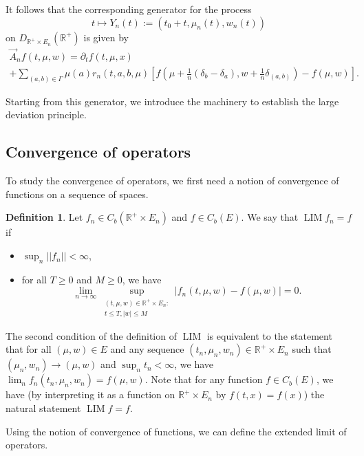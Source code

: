 \documentclass[a4paper]{article}
\newcommand{\bR}{\mathbb{R}}
\DeclareMathOperator*{\LIM}{LIM}
\newcommand{\vn}[1]{\left| \! \left| #1\right| \! \right|}
\numberwithin{equation}{section}
\theoremstyle{definition}
\newtheorem{definition}[theorem]{Definition}
\begin{document}
It follows that the corresponding generator for the process 
\begin{equation*}
	t \mapsto Y_n(t) := (t_0 + t,\mu_n(t),w_n(t))
\end{equation*}
on $D_{\bR^+ \times E_n}(\bR^+)$ is given by
\begin{multline*}
	\vec{A}_n f(t,\mu,w) = \partial_t f(t,\mu,x) \\
	+ \sum_{(a,b) \in \Gamma} \mu(a) r_n(t,a,b,\mu) \left[f\left(\mu + \frac{1}{n}(\delta_b - \delta_a), w + \frac{1}{n} \delta_{(a,b)}\right) - f\left(\mu,w\right)  \right].
\end{multline*}

Starting from this generator, we introduce the machinery to establish the large deviation principle.


\subsection{Convergence of operators}

To study the convergence of operators, we first need a notion of convergence of functions on a sequence of spaces.


\begin{definition}
	Let $f_n \in C_b(\bR^+ \times E_n)$ and $f \in C_b(E)$. We say that $\LIM f_n = f$ if 
	\begin{itemize}
		\item $\sup_n \vn{f_n} < \infty$,
		\item for all $T \geq 0$ and $M \geq 0$, we have
		\begin{equation*} 
			\lim_{n \rightarrow \infty} \sup_{\substack{(t,\mu,w) \in \bR^+ \times E_n: \\ t \leq T, |w| \leq M}} \left|f_n(t,\mu,w) - f(\mu,w) \right| = 0.
		\end{equation*}
	\end{itemize}
\end{definition}


The second condition of the definition of $\LIM$ is equivalent to the statement that for all $(\mu,w) \in E$ and any sequence $(t_n,\mu_n,w_n) \in \bR^+ \times E_n$ such that $(\mu_n,w_n) \rightarrow (\mu,w)$ and $\sup_n t_n < \infty$, we have $\lim_n f_n(t_n,\mu_n,w_n) = f(\mu,w)$. Note that for any function $f \in C_b(E)$, we have (by interpreting it as a function on $\bR^+ \times E_n$ by $f(t,x) = f(x)$) the natural statement $\LIM f = f$.



Using the notion of convergence of functions, we can define the extended limit of operators.
\end{document}
